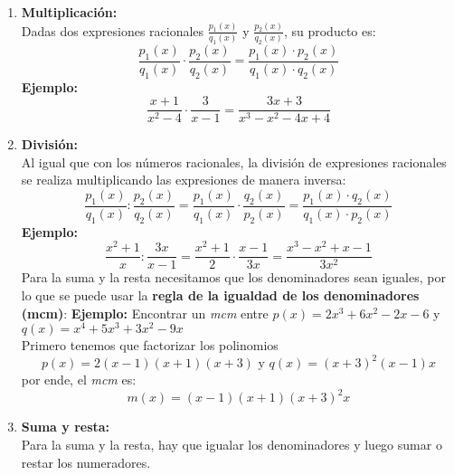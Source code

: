 \begin{enumerate}
    \item \textbf{Multiplicación:} \\
    Dadas dos expresiones racionales $\frac{p_1(x)}{q_1(x)}$ y $\frac{p_2(x)}{q_2(x)}$, su producto es:
    $$\frac{p_1(x)}{q_1(x)} \cdot \frac{p_2(x)}{q_2(x)} = \frac{p_1(x) \cdot p_2(x)}{q_1(x) \cdot q_2(x)}$$
    \textbf{Ejemplo:}
    $$\frac{x+1}{x^2-4} \cdot \frac{3}{x-1} = \frac{3x+3}{x^3-x^2-4x+4}$$
    \item {\textbf{División:} \\
    Al igual que con los números racionales, la división de expresiones racionales se realiza multiplicando las expresiones de manera inversa:
    $$\frac{p_1(x)}{q_1(x)} : \frac{p_2(x)}{q_2(x)} = \frac{p_1(x)}{q_1(x)} \cdot \frac{q_2(x)}{p_2(x)} = \frac{p_1(x) \cdot q_2(x)}{q_1(x) \cdot p_2(x)}$$
    \textbf{Ejemplo:}
    $$\frac{x^2 + 1}{x} : \frac{3x}{x-1} = \frac{x^2 + 1}{2} \cdot \frac{x-1}{3x} = \frac{x^3 -x^2 + x - 1}{3x^2}$$}
    Para la suma y la resta necesitamos que los denominadores sean iguales, por lo que se puede usar la \textbf{regla de la igualdad de los denominadores (mcm)}:
    \textbf{Ejemplo:} Encontrar un \emph{mcm} entre $p(x) = 2x^3 + 6x^2 -2x -6$ y $q(x) = x^4 + 5x^3 + 3x^2 - 9x$\\
    Primero tenemos que factorizar los polinomios
    $$p(x) = 2(x-1)(x+1)(x+3) \text{ y } q(x) = (x+3)^2(x-1)x$$
    por ende, el \emph{mcm} es:
    $$m(x) = (x-1)(x+1)(x+3)^2x$$
    \item \textbf{Suma y resta:} \\
    Para la suma y la resta, hay que igualar los denominadores y luego sumar o restar los numeradores.
\end{enumerate}

